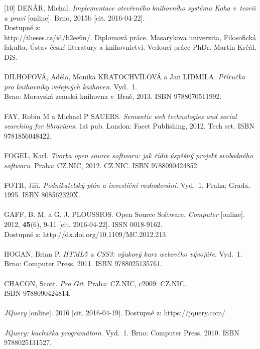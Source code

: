 \documentclass[
	11pt, oneside, printed, final, palatino, monochrome
	microtype,
	table,   %
	lof,     %
	lot     %
]{fithesis3}
\begin{document}
{[10] DENÁR, Michal. \textit{Implementace otevřeného knihovního systému Koha v~teorii a praxi} [online]. Brno, 2015b [cit. 2016-04-22]. \\Dostupné z: \\http://theses.cz/id/b2ee6n/. Diplomová práce. Masarykova univerzita, Filosofická fakulta, Ústav české literatury a knihovnictví. Vedoucí práce PhDr. Martin Krčál, DiS.
~\\ ~\\ \noindent
[11] DILHOFOVÁ, Adéla, Monika KRATOCHVÍLOVÁ a Jan LIDMILA. \textit{Příručka pro knihovníky veřejných knihoven}. Vyd.~1. \\Brno: Moravská zemská knihovna v~Brně, 2013. ISBN 9788070511992.
~\\ ~\\ \noindent
[12] FAY, Robin M a Michael P SAUERS. \textit{Semantic web technologies and social searching for librarians}. 1st pub. London: Facet Publishing, 2012. Tech set. ISBN 9781856048422.
~\\ ~\\ \noindent
[13] FOGEL, Karl. \textit{Tvorba open source softwaru: jak řídit úspěšný projekt svobodného softwaru}. Praha: CZ.NIC, 2012. CZ.NIC. ISBN 9788090424852.
~\\ ~\\ \noindent
[14] FOTR, Jiří. \textit{Podnikatelský plán a investiční rozhodování}. Vyd.~1. Praha: Grada, 1995. ISBN 808562320X.
~\\ ~\\ \noindent
[15] GAFF, B. M. a G. J. PLOUSSIOS. Open Source Software. \textit{Computer} [online]. 2012, 	\textbf{45}(6), 9-11 [cit. 2016-04-22]. ISSN 0018-9162. \\Dostupné z: http://dx.doi.org/10.1109/MC.2012.213
~\\ ~\\ \noindent
[16] HOGAN, Brian P. \textit{HTML5 a CSS3: výukový kurz webového vývojáře}. Vyd.~1. Brno: Computer Press, 2011. ISBN 9788025135761.
~\\ ~\\ \noindent
[17] CHACON, Scott. \textit{Pro Git}. Praha: CZ.NIC, c2009. CZ.NIC. \\ISBN 9788090424814.
~\\ ~\\ \noindent
[18] \textit{JQuery} [online]. 2016 [cit. 2016-04-19]. Dostupné z: https://jquery.com/
~\\ ~\\ \noindent
[19] \textit{JQuery: kuchařka programátora}. Vyd.~1. Brno: Computer Press, 2010. ISBN 9788025131527.
}
\end{document}
